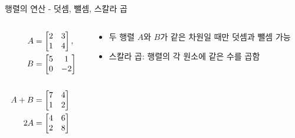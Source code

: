 \documentclass[aspectratio=169]{beamer}
\begin{document}
\begin{frame}{행렬의 연산 - 덧셈, 뺄셈, 스칼라 곱}
  \begin{columns}
    \begin{column}{0.5\textwidth}
      \begin{align*}
        A &= \begin{bmatrix} 2 & 3 \\ 1 & 4 \end{bmatrix}, \\
        B &= \begin{bmatrix} 5 & 1 \\ 0 & -2 \end{bmatrix} \\
        \vspace{10pt}
        \phantom{blank} \\
        A + B &= \begin{bmatrix} 7 & 4 \\ 1 & 2 \end{bmatrix} \\
        2A &= \begin{bmatrix} 4 & 6 \\ 2 & 8 \end{bmatrix}
      \end{align*}
    \end{column}
    \begin{column}{0.5\textwidth}
      \begin{itemize}
        \item 두 행렬 \( A \)와 \( B \)가 같은 차원일 때만 덧셈과 뺄셈 가능
        \item 스칼라 곱: 행렬의 각 원소에 같은 수를 곱함
      \end{itemize}
    \end{column}
  \end{columns}
\end{frame}
\end{document}
